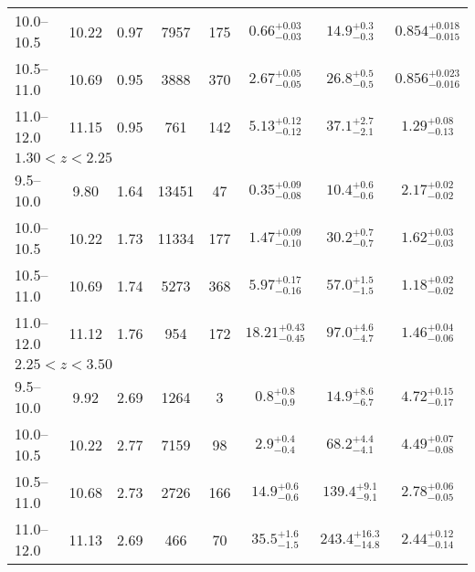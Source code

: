 \begin{table*}
\begin{tabular}{lc|c|c c|c c c}
10.0--10.5          & 10.22   & 0.97    & 7957  & 175   & $ 0.66^{+0.03}_{-0.03} $       & $14.9 ^{+0.3 }_{-0.3 }$       & $0.854^{+0.018}_{-0.015} $    \T \B \\   
10.5--11.0              & 10.69   & 0.95        & 3888  & 370   & $ 2.67^{+0.05}_{-0.05} $       & $26.8 ^{+0.5 }_{-0.5 }$       & $0.856^{+0.023}_{-0.016} $    \T \B \\   
11.0--12.0          & 11.15   & 0.95    & 761   & 142   & $ 5.13^{+0.12}_{-0.12} $       & $37.1 ^{+2.7 }_{-2.1 }$       & $1.29 ^{+0.08 }_{-0.13 } $    \T \B \\   
\hline
\hline
\multicolumn{8}{l}{$1.30<z<2.25$}        \\
\hline                  
9.5--10.0               &  9.80    & 1.64       & 13451 & 47    & $ 0.35^{+0.09}_{-0.08} $       & $10.4^{+0.6}_{-0.6}$          & $2.17^{+0.02 }_{-0.02} $      \T \B \\   
10.0--10.5          & 10.22    & 1.73   & 11334 & 177   & $ 1.47^{+0.09}_{-0.10} $       & $30.2^{+0.7}_{-0.7}$          & $1.62^{+0.03 }_{-0.03} $      \T \B \\   
10.5--11.0              & 10.69    & 1.74       & 5273  & 368   & $ 5.97^{+0.17}_{-0.16} $       & $57.0^{+1.5}_{-1.5}$          & $1.18^{+0.02 }_{-0.02} $      \T \B \\   
11.0--12.0          & 11.12    & 1.76   & 954   & 172   & $18.21^{+0.43}_{-0.45} $       & $97.0^{+4.6}_{-4.7}$          & $1.46^{+0.04 }_{-0.06} $      \T \B \\   
\hline
\hline
\multicolumn{8}{l}{$2.25<z<3.50$}        \\
\hline
9.5--10.0               &  9.92    & 2.69       & 1264  & 3         & $  0.8^{+0.8 }_{-0.9} $    & $ 14.9^{+ 8.6}_{- 6.7}$       & $4.72^{+0.15}_{-0.17} $        \T \B \\  
10.0--10.5          & 10.22        & 2.77       & 7159  & 98    & $  2.9^{+0.4 }_{-0.4} $      & $ 68.2^{+ 4.4}_{- 4.1}$       & $4.49^{+0.07}_{-0.08} $        \T \B \\  
10.5--11.0              & 10.68    & 2.73       & 2726  & 166   & $ 14.9^{+0.6 }_{-0.6} $   & $139.4^{+ 9.1}_{- 9.1}$  & $2.78^{+0.06}_{-0.05} $        \T \B \\  
11.0--12.0          & 11.13        & 2.69       & 466   & 70    & $ 35.5^{+1.6 }_{-1.5} $   & $243.4^{+16.3}_{-14.8}$  & $2.44^{+0.12}_{-0.14} $        \T \B \\  
\hline

\end{tabular}%
\end{table*}
